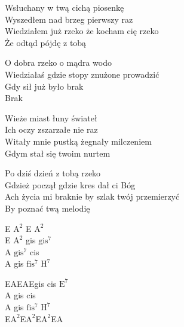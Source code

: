 \begin{textn}
    Wsłuchany w twą cichą piosenkę\\
    Wyszedłem nad brzeg pierwszy raz\\
    Wiedziałem już rzeko że kocham cię rzeko\\
    Że odtąd pójdę z tobą

    \vin O dobra rzeko o mądra wodo\\
    \vin Wiedziałaś gdzie stopy znużone prowadzić\\
    \vin Gdy sił już było brak\\
    \vin Brak

    Wieże miast łuny świateł\\
    Ich oczy zszarzałe nie raz\\
    Witały mnie pustką żegnały milczeniem\\
    Gdym stał się twoim nurtem

    Po dziś dzień z tobą rzeko\\
    Gdzież począł gdzie kres dał ci Bóg\\
    Ach życia mi braknie by szlak twój przemierzyć\\
    By poznać twą melodię
\end{textn}
\begin{chordw}
    E $\mathrm{A^2}$ E $\mathrm{A^2}$\\
    E $\mathrm{A^2}$ gis $\mathrm{gis^7}$\\
    A $\mathrm{gis^7}$ cis\\
    A gis $\mathrm{fis^7}$ $\mathrm{H^7}$

    EAEAEgis cis $\mathrm{E^7}$\\
    A gis cis\\
    A gis $\mathrm{fis^7}$ $\mathrm{H^7}$\\
    E$\mathrm{A^{2}}$E$\mathrm{A^{2}}$E$\mathrm{A^{2}}$EA

\end{chordw}
